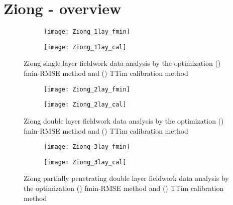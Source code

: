 \clearpage\section{Ziong - overview}
\label{sec:Ziong_overview}

\begin{figure}[h!]
	\centering
	\begin{subfigure}[b]{\linewidth}
		\centering\texttt{[image: Ziong\_1lay\_fmin]}
		\captionsetup{justification=centering}		
		\caption{\label{fig:Ziong_1lay_fmin}}
		\end{subfigure}\vfill
	\begin{subfigure}[b]{\linewidth}
		\centering\texttt{[image: Ziong\_1lay\_cal]}
		\captionsetup{justification=centering}		
		\caption{\label{fig:Ziong_1lay_cal}}
		\end{subfigure}
	\captionsetup{justification=centering}	
	\caption{Ziong single layer fieldwork data analysis by the optimization () fmin-RMSE method and () TTim calibration method} 
	\label{fig:Ziong_1lay_analysis}
\end{figure} 

\begin{figure}[h!]
	\centering
	\begin{subfigure}[b]{\linewidth}
		\centering\texttt{[image: Ziong\_2lay\_fmin]}
		\captionsetup{justification=centering}		
		\caption{\label{fig:Ziong_2lay_fmin}}
		\end{subfigure}\vfill
	\begin{subfigure}[b]{\linewidth}
		\centering\texttt{[image: Ziong\_2lay\_cal]}
		\captionsetup{justification=centering}		
		\caption{\label{fig:Ziong_2lay_cal}}
		\end{subfigure}
	\captionsetup{justification=centering}	
	\caption{Ziong double layer fieldwork data analysis by the optimization () fmin-RMSE method and () TTim calibration method} 
	\label{fig:Ziong_2lay_analysis}
\end{figure} 

\begin{figure}[h!]
	\centering
	\begin{subfigure}[b]{\linewidth}
		\centering\texttt{[image: Ziong\_3lay\_fmin]}
		\captionsetup{justification=centering}		
		\caption{\label{fig:Ziong_3lay_fmin}}
		\end{subfigure}\vfill
	\begin{subfigure}[b]{\linewidth}
		\centering\texttt{[image: Ziong\_3lay\_cal]}
		\captionsetup{justification=centering}		
		\caption{\label{fig:Ziong_3lay_cal}}
		\end{subfigure}
	\captionsetup{justification=centering}	
	\caption{Ziong partially penetrating double layer fieldwork data analysis by the optimization () fmin-RMSE method and () TTim calibration method} 
	\label{fig:Ziong_3lay_analysis}
\end{figure} 